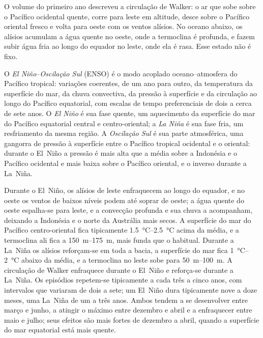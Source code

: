O volume do primeiro ano descreveu a circulação de Walker: o ar que sobe sobre o Pacífico ocidental quente,
corre para leste em altitude, desce sobre o Pacífico oriental fresco e volta para oeste com os ventos
alísios. No oceano abaixo, os alísios acumulam a água quente no oeste, onde a termoclina é
profunda, e fazem subir água fria ao longo do equador no leste, onde ela é rasa. Esse estado não é
fixo.

\begin{definition}\label{def:b2:climate-variability:enso}
O \emph{El Niño--Oscilação Sul} (ENSO) é o
modo acoplado oceano--atmosfera do Pacífico tropical: variações coerentes, de um ano para outro, da
temperatura da superfície do mar, da chuva convectiva, da pressão à superfície e da circulação ao longo
do Pacífico equatorial, com escalas de tempo preferenciais de dois a cerca de sete anos. O \emph{El
Niño} é sua fase quente, um aquecimento da superfície do mar do Pacífico equatorial central e
centro-oriental; a \emph{La Niña} é sua fase fria, um resfriamento da
mesma região. A \emph{Oscilação Sul} é sua parte atmosférica,
uma gangorra de pressão à superfície entre o Pacífico tropical ocidental e o oriental: durante o El~Niño
a pressão é mais alta que a média sobre a Indonésia e o Pacífico ocidental e mais baixa sobre o
Pacífico oriental, e o inverso durante a La~Niña.
\end{definition}

Durante o El~Niño, os alísios de leste enfraquecem ao longo do equador, e no oeste os
ventos de baixos níveis podem até soprar de oeste; a água quente do oeste espalha-se para leste, e a convecção
profunda e sua chuva a acompanham, deixando a Indonésia e o norte da Austrália mais secos. A superfície do mar
do Pacífico centro-oriental fica tipicamente \qtyrange{1.5}{2.5}{\celsius} acima da média, e
a termoclina ali fica a \qtyrange{150}{175}{m}, mais funda que o habitual. Durante a La~Niña os alísios
reforçam-se em toda a bacia, a superfície do mar fica \qtyrange{1}{2}{\celsius} abaixo da
média, e a termoclina no leste sobe para \qtyrange{50}{100}{m}. A circulação de Walker
enfraquece durante o El~Niño e reforça-se durante a La~Niña. Os episódios repetem-se tipicamente a cada três a
cinco anos, com intervalos que variaram de dois a sete; um El~Niño dura tipicamente nove a
doze meses, uma La~Niña de um a três anos. Ambos tendem a se desenvolver entre março e junho, a
atingir o máximo entre dezembro e abril e a enfraquecer entre maio e julho; seus efeitos são mais fortes
de dezembro a abril, quando a superfície do mar equatorial está mais quente.

